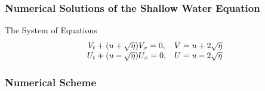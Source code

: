 \documentclass[screen]{beamer}
\begin{document}
\begin{frame}
	\frametitle{Numerical Solutions of the Shallow Water Equation}
	\begin{block}{The System of Equations}
		\begin{align*}
		\begin{array}{c c}
		V_t + (u+\sqrt{\eta})V_x = 0, & V = u + 2 \sqrt \eta\\
		U_t + (u-\sqrt{\eta})U_x = 0, & U = u - 2\sqrt \eta
		\end{array}
		\end{align*}
	\end{block}
\end{frame}
\begin{frame}
	\frametitle{Numerical Scheme}
\end{frame}
\end{document}
